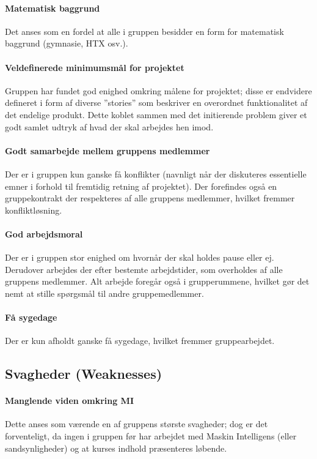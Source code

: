 \paragraph{Matematisk baggrund}
Det anses som en fordel at alle i gruppen besidder en form for matematisk baggrund (gymnasie, HTX osv.).

\paragraph{Veldefinerede minimumsmål for projektet}
Gruppen har fundet god enighed omkring målene for projektet; disse er endvidere defineret i form af diverse ''stories'' som beskriver en overordnet funktionalitet af det endelige produkt.
Dette koblet sammen med det initierende problem giver et godt samlet udtryk af hvad der skal arbejdes hen imod.

\paragraph{Godt samarbejde mellem gruppens medlemmer}
Der er i gruppen kun ganske få konflikter (navnligt når der diskuteres essentielle emner i forhold til fremtidig retning af projektet).
Der forefindes også en gruppekontrakt der respekteres af alle gruppens medlemmer, hvilket fremmer konfliktløsning.

\paragraph{God arbejdsmoral}
Der er i gruppen stor enighed om hvornår der skal holdes pause eller ej.
Derudover arbejdes der efter bestemte arbejdstider, som overholdes af alle gruppens medlemmer.
Alt arbejde foregår også i grupperummene, hvilket gør det nemt at stille spørgsmål til andre gruppemedlemmer.

\paragraph{Få sygedage}
Der er kun afholdt ganske få sygedage, hvilket fremmer gruppearbejdet.

\subsection{Svagheder \textnormal{(\textbf{W}eaknesses)}}

\paragraph{Manglende viden omkring MI}\label{swot:manglende_viden_mi}
Dette anses som værende en af gruppens største svagheder; dog er det forventeligt, da ingen i gruppen før har arbejdet med Maskin Intelligens (eller sandsynligheder) og at kurses indhold præsenteres løbende.

